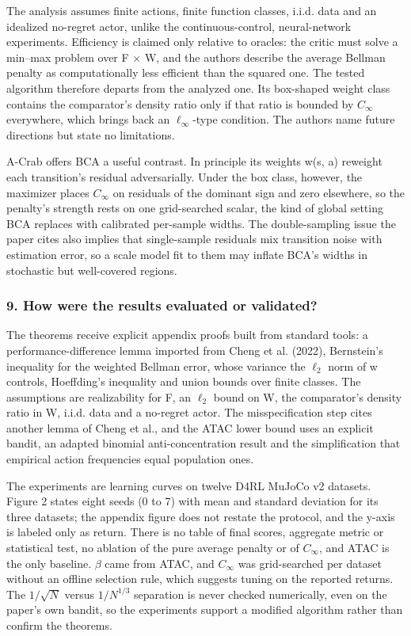\documentclass[11pt]{article}
\newcommand{\question}[1]{\subsubsection*{#1}}
\begin{document}
The analysis assumes finite actions, finite function classes, i.i.d. data and an idealized no-regret actor, unlike the continuous-control, neural-network experiments. Efficiency is claimed only relative to oracles: the critic must solve a min--max problem over F \ensuremath{\times} W, and the authors describe the average Bellman penalty as computationally less efficient than the squared one. The tested algorithm therefore departs from the analyzed one. Its box-shaped weight class contains the comparator's density ratio only if that ratio is bounded by $C_\infty$ everywhere, which brings back an $\ell_\infty$-type condition. The authors name future directions but state no limitations.

A-Crab offers BCA a useful contrast. In principle its weights w(s, a) reweight each transition's residual adversarially. Under the box class, however, the maximizer places $C_\infty$ on residuals of the dominant sign and zero elsewhere, so the penalty's strength rests on one grid-searched scalar, the kind of global setting BCA replaces with calibrated per-sample widths. The double-sampling issue the paper cites also implies that single-sample residuals mix transition noise with estimation error, so a scale model fit to them may inflate BCA's widths in stochastic but well-covered regions.

\question{9. How were the results evaluated or validated?}

The theorems receive explicit appendix proofs built from standard tools: a performance-difference lemma imported from Cheng et al. (2022), Bernstein's inequality for the weighted Bellman error, whose variance the $\ell_2$ norm of w controls, Hoeffding's inequality and union bounds over finite classes. The assumptions are realizability for F, an $\ell_2$ bound on W, the comparator's density ratio in W, i.i.d. data and a no-regret actor. The misspecification step cites another lemma of Cheng et al., and the ATAC lower bound uses an explicit bandit, an adapted binomial anti-concentration result and the simplification that empirical action frequencies equal population ones.

The experiments are learning curves on twelve D4RL MuJoCo v2 datasets. Figure 2 states eight seeds (0 to 7) with mean and standard deviation for its three datasets; the appendix figure does not restate the protocol, and the y-axis is labeled only as return. There is no table of final scores, aggregate metric or statistical test, no ablation of the pure average penalty or of $C_\infty$, and ATAC is the only baseline. \ensuremath{\beta} came from ATAC, and $C_\infty$ was grid-searched per dataset without an offline selection rule, which suggests tuning on the reported returns. The $1/\sqrt{N}$ versus $1/N^{1/3}$ separation is never checked numerically, even on the paper's own bandit, so the experiments support a modified algorithm rather than confirm the theorems.
\end{document}
